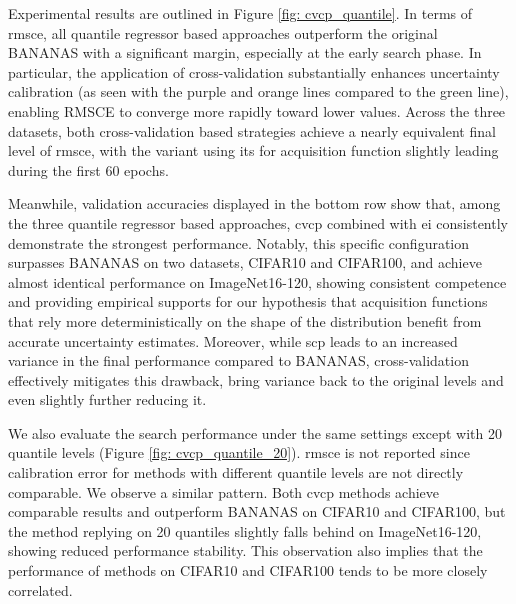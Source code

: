 \documentclass[a4paper,oneside,bibliography=totoc]{scrbook}
\begin{document}
\begin{description}[leftmargin=0cm, listparindent=\parindent]
 	Experimental results are outlined in Figure \ref{fig: cvcp_quantile}. In terms of \gls{rmsce}, all quantile regressor based approaches outperform the original BANANAS with a significant margin, especially at the early search phase. In particular, the application of cross-validation substantially enhances uncertainty calibration (as seen with the purple and orange lines compared to the green line), enabling RMSCE to converge more rapidly toward lower values. Across the three datasets, both cross-validation based strategies achieve a nearly equivalent final level of \gls{rmsce}, with the variant using \gls{its} for acquisition function slightly leading during the first 60 epochs.
 	
 	Meanwhile, validation accuracies displayed in the bottom row show that, among the three quantile regressor based approaches, \gls{cvcp} combined with \gls{ei} consistently demonstrate the strongest performance. Notably, this specific configuration surpasses BANANAS on two datasets, CIFAR10 and CIFAR100, and achieve almost identical performance on ImageNet16-120, showing consistent competence and providing empirical supports for our hypothesis that acquisition functions that rely more deterministically on the shape of the distribution benefit from accurate uncertainty estimates.	Moreover, while \gls{scp} leads to an increased variance in the final performance compared to BANANAS, cross-validation effectively mitigates this drawback, bring variance back to the original levels and even slightly further reducing it. 
 	
 	We also evaluate the search performance under the same settings except with 20 quantile levels (Figure \ref{fig: cvcp_quantile_20}). \gls{rmsce} is not reported since calibration error for methods with different quantile levels are not directly comparable. We observe a similar pattern. Both \gls{cvcp} methods achieve comparable results and outperform BANANAS on CIFAR10 and CIFAR100, but the method replying on 20 quantiles slightly falls behind on ImageNet16-120, showing reduced performance stability. This observation also implies that the performance of methods on CIFAR10 and CIFAR100 tends to be more closely correlated.
 	

\end{description}
\end{document}
